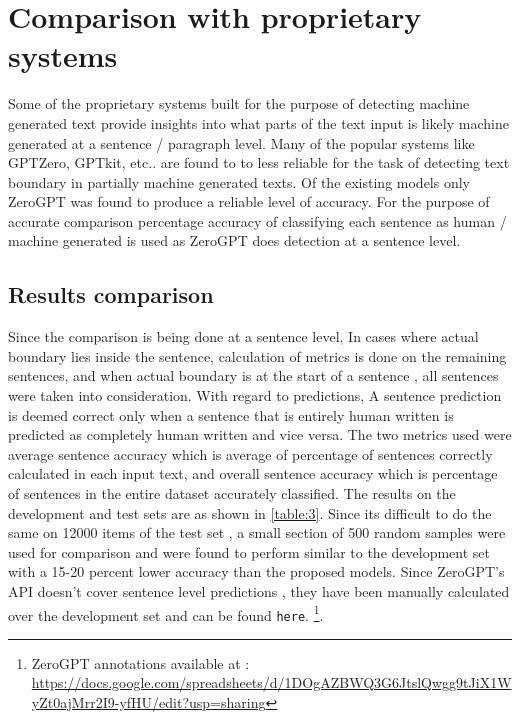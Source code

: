 \documentclass[11pt]{article}
\begin{document}
\section{Comparison with proprietary systems}
Some of the proprietary systems built for the purpose of detecting machine generated text provide insights into what parts of the text input is likely machine generated at a sentence / paragraph level. Many of the popular systems like GPTZero, GPTkit, etc.. are found to to less reliable for the task of detecting text boundary in partially machine generated texts. Of the existing models only ZeroGPT was found to produce a reliable level of accuracy. For the purpose of accurate comparison percentage accuracy of classifying each sentence as human / machine generated is used as ZeroGPT does detection at a sentence level.

\subsection{Results comparison}
Since the comparison is being done at a sentence level, In cases where actual boundary lies inside the sentence, calculation of metrics is done on the remaining sentences, and when actual boundary is at the start of a sentence , all sentences were taken into consideration. With regard to predictions, A sentence prediction is deemed correct only when a sentence that is entirely human written is predicted as completely human written and vice versa. The two metrics used were average sentence accuracy which is average of percentage of sentences correctly calculated in each input text, and overall sentence accuracy which is percentage of sentences in the entire dataset accurately classified. The results on the development and test sets are as shown in \autoref{table:3}. Since its difficult to do the same on 12000 items of the test set , a small section of 500 random samples were used for comparison and were found to perform similar to the development set with a 15-20 percent lower accuracy than the proposed models. Since ZeroGPT's API doesn't cover sentence level predictions , they have been manually calculated over the development set and can be found \verb|here|. \footnote{ZeroGPT annotations available at : \url{https://docs.google.com/spreadsheets/d/1DOgAZBWQ3G6JtslQwgg9tJiX1WyZt0ajMrr2I9-yfHU/edit?usp=sharing}}.
\end{document}
